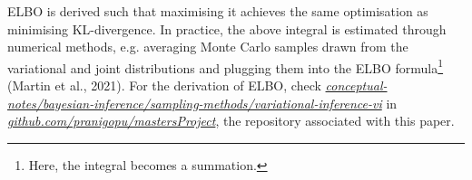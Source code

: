 \documentclass[conference]{IEEEtran}
\begin{document}
ELBO is derived such that maximising it achieves the same optimisation as minimising KL-divergence. In practice, the above integral is estimated through numerical methods, e.g. averaging Monte Carlo samples drawn from the variational and joint distributions and plugging them into the ELBO formula\footnote{Here, the integral becomes a summation.} (Martin et al., 2021). For the derivation of ELBO, check \href{https://github.com/pranigopu/mastersProject/tree/main/conceptual-notes/bayesian-inference/sampling-methods/variational-inference-vi}{\textit{conceptual-notes/bayesian-inference/sampling-methods/variational-inference-vi}} in \href{https://github.com/pranigopu/mastersProject}{\textit{github.com/pranigopu/mastersProject}}, the repository associated with this paper.
\end{document}

